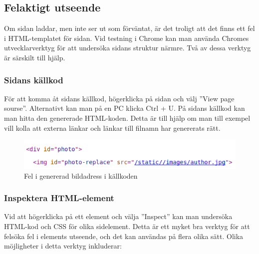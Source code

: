 \subsection{Felaktigt utseende}
Om sidan laddar, men inte ser ut som förväntat, är det troligt att det finns ett fel i HTML-templatet för sidan. Vid testning i Chrome kan man använda Chromes utvecklarverktyg för att undersöka sidans struktur närmre. Två av dessa verktyg är särskilt till hjälp.

\subsubsection{Sidans källkod}
För att komma åt sidans källkod, högerklicka på sidan och välj ''View page sourse''. Alternativt kan man på en PC klicka Ctrl + U. På sidans källkod kan man hitta den genererade HTML-koden. Detta är till hjälp om man till exempel vill kolla att externa länkar och länkar till filnamn har genererats rätt.

\begin{figure}
  \centering
  \includegraphics{sourcecode}
  \caption{Fel i genererad bildadress i källkoden}
\end{figure}


\subsubsection{Inspektera HTML-element}
Vid att högerklicka på ett element och välja ''Inspect'' kan man undersöka HTML-kod och CSS för olika sidelement. Detta är ett myket bra verktyg för att felsöka fel i elements utseende, och det kan användas på flera olika sätt. Olika möjligheter i detta verktyg inkluderar:

